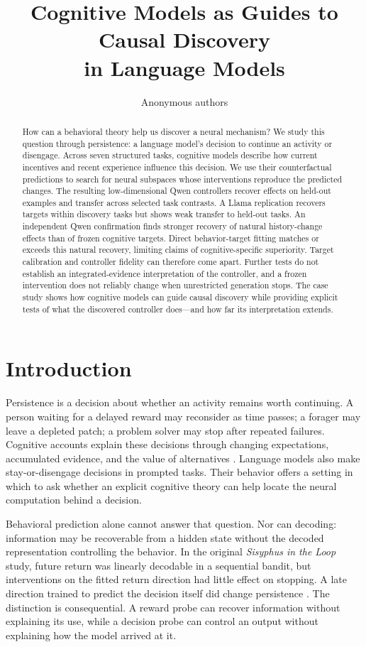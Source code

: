 \documentclass{article}
\title{Cognitive Models as Guides to Causal Discovery\\in Language Models}
\author{Anonymous authors}
\begin{document}
\maketitle
\begin{abstract}
How can a behavioral theory help us discover a neural mechanism? We study this question through persistence: a language model's decision to continue an activity or disengage. Across seven structured tasks, cognitive models describe how current incentives and recent experience influence this decision. We use their counterfactual predictions to search for neural subspaces whose interventions reproduce the predicted changes. The resulting low-dimensional Qwen controllers recover effects on held-out examples and transfer across selected task contrasts. A Llama replication recovers targets within discovery tasks but shows weak transfer to held-out tasks. An independent Qwen confirmation finds stronger recovery of natural history-change effects than of frozen cognitive targets. Direct behavior-target fitting matches or exceeds this natural recovery, limiting claims of cognitive-specific superiority. Target calibration and controller fidelity can therefore come apart. Further tests do not establish an integrated-evidence interpretation of the controller, and a frozen intervention does not reliably change when unrestricted generation stops. The case study shows how cognitive models can guide causal discovery while providing explicit tests of what the discovered controller does---and how far its interpretation extends.
\end{abstract}

\section{Introduction}
Persistence is a decision about whether an activity remains worth continuing. A person waiting for a delayed reward may reconsider as time passes; a forager may leave a depleted patch; a problem solver may stop after repeated failures. Cognitive accounts explain these decisions through changing expectations, accumulated evidence, and the value of alternatives \citep{mcguire2015persistence,constantino2015foraging,sukhov2025quitting}. Language models also make stay-or-disengage decisions in prompted tasks. Their behavior offers a setting in which to ask whether an explicit cognitive theory can help locate the neural computation behind a decision.

Behavioral prediction alone cannot answer that question. Nor can decoding: information may be recoverable from a hidden state without the decoded representation controlling the behavior. In the original \emph{Sisyphus in the Loop} study, future return was linearly decodable in a sequential bandit, but interventions on the fitted return direction had little effect on stopping. A late direction trained to predict the decision itself did change persistence \citep{gupta2026sisyphus}. The distinction is consequential. A reward probe can recover information without explaining its use, while a decision probe can control an output without explaining how the model arrived at it.
\end{document}
